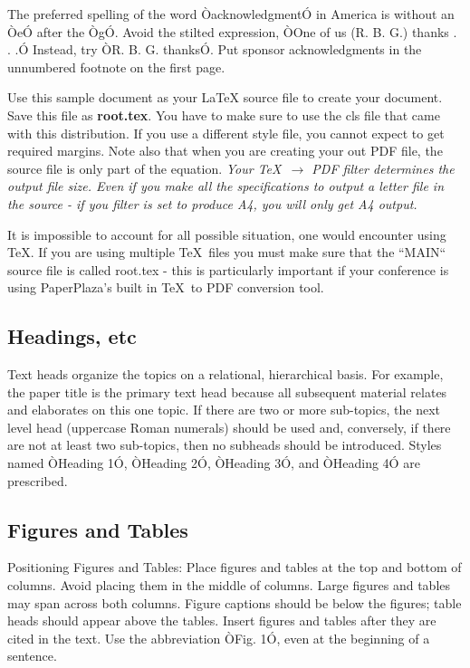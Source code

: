 \documentclass[a4paper, 10pt, conference]{ieeeconf}      %
\begin{document}
The preferred spelling of the word ÒacknowledgmentÓ in America is without an ÒeÓ after the ÒgÓ. Avoid the stilted expression, ÒOne of us (R. B. G.) thanks . . .Ó  Instead, try ÒR. B. G. thanksÓ. Put sponsor acknowledgments in the unnumbered footnote on the first page.

Use this sample document as your LaTeX source file to create your document. Save this file as {\bf root.tex}. You have to make sure to use the cls file that came with this distribution. If you use a different style file, you cannot expect to get required margins. Note also that when you are creating your out PDF file, the source file is only part of the equation. {\it Your \TeX\ $\rightarrow$ PDF filter determines the output file size. Even if you make all the specifications to output a letter file in the source - if you filter is set to produce A4, you will only get A4 output. }

It is impossible to account for all possible situation, one would encounter using \TeX. If you are using multiple \TeX\ files you must make sure that the ``MAIN`` source file is called root.tex - this is particularly important if your conference is using PaperPlaza's built in \TeX\ to PDF conversion tool.

\subsection{Headings, etc}

Text heads organize the topics on a relational, hierarchical basis. For example, the paper title is the primary text head because all subsequent material relates and elaborates on this one topic. If there are two or more sub-topics, the next level head (uppercase Roman numerals) should be used and, conversely, if there are not at least two sub-topics, then no subheads should be introduced. Styles named ÒHeading 1Ó, ÒHeading 2Ó, ÒHeading 3Ó, and ÒHeading 4Ó are prescribed.

\subsection{Figures and Tables}

Positioning Figures and Tables: Place figures and tables at the top and bottom of columns. Avoid placing them in the middle of columns. Large figures and tables may span across both columns. Figure captions should be below the figures; table heads should appear above the tables. Insert figures and tables after they are cited in the text. Use the abbreviation ÒFig. 1Ó, even at the beginning of a sentence.
\end{document}
